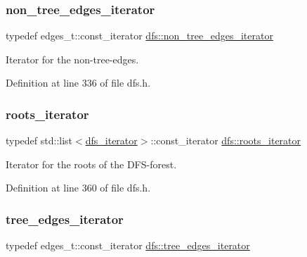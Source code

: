 \mbox{\label{classdfs_a95e353f354d3b31daded0c4fe749171a}} 
\subsubsection{\texorpdfstring{non\+\_\+tree\+\_\+edges\+\_\+iterator}{non\_tree\_edges\_iterator}}
{\footnotesize\ttfamily typedef edges\+\_\+t\+::const\+\_\+iterator \mbox{\hyperlink{classdfs_a95e353f354d3b31daded0c4fe749171a}{dfs\+::non\+\_\+tree\+\_\+edges\+\_\+iterator}}\hspace{0.3cm}{\ttfamily [inherited]}}



Iterator for the non-\/tree-\/edges. 



Definition at line 336 of file dfs.\+h.

\mbox{\label{classdfs_a1ea6e8eb2766ac95ac48a8523359065a}} 
\subsubsection{\texorpdfstring{roots\+\_\+iterator}{roots\_iterator}}
{\footnotesize\ttfamily typedef std\+::list$<$\mbox{\hyperlink{classdfs_a15fe023a5a1f7ddda00f3d87110d9a32}{dfs\+\_\+iterator}}$>$\+::const\+\_\+iterator \mbox{\hyperlink{classdfs_a1ea6e8eb2766ac95ac48a8523359065a}{dfs\+::roots\+\_\+iterator}}\hspace{0.3cm}{\ttfamily [inherited]}}



Iterator for the roots of the D\+F\+S-\/forest. 



Definition at line 360 of file dfs.\+h.

\mbox{\label{classdfs_accde8d5403404f6d22fe4756d4ffedd5}} 
\subsubsection{\texorpdfstring{tree\+\_\+edges\+\_\+iterator}{tree\_edges\_iterator}}
{\footnotesize\ttfamily typedef edges\+\_\+t\+::const\+\_\+iterator \mbox{\hyperlink{classdfs_accde8d5403404f6d22fe4756d4ffedd5}{dfs\+::tree\+\_\+edges\+\_\+iterator}}\hspace{0.3cm}{\ttfamily [inherited]}}



